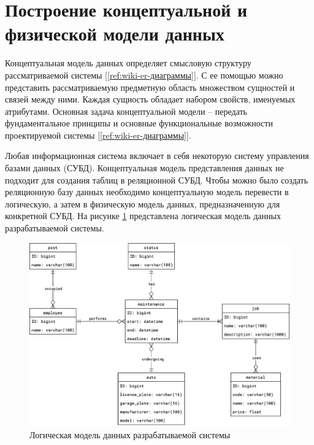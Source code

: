 \documentclass[../nirs.tex]{subfiles}
\begin{document}
\section{Построение концептуальной и физической модели данных}
Концептуальная модель данных определяет смысловую структуру рассматриваемой
системы [\ref{ref:wiki-er-диаграммы}]. С ее помощью можно представить рассматриваемую предметную область
множеством сущностей и связей между ними. Каждая сущность обладает набором
свойств, именуемых атрибутами. Основная задача концептуальной модели -- передать
фундаментальное принципы и основные функциональные возможности проектируемой
системы [\ref{ref:wiki-er-диаграммы}].

Любая информационная система включает в себя некоторую систему управления базами
данных (СУБД). Концептуальная модель представления данных не подходит для
создания таблиц в реляционной СУБД. Чтобы можно было создать реляционную базу
данных необходимо концептуальную модель перевести в логическую, а затем в
физическую  модель данных, предназначенную для конкретной СУБД. На рисунке
\ref{fig:3_1_db_logical} представлена логическая модель данных разрабатываемой
системы.

\clearpage
\begin{landscape}

\begin{figure}[H]
	\centering
	\includegraphics[keepaspectratio,width=\paperwidth]{./images/3_1_db_logical.png}
	\caption{Логическая модель данных разрабатываемой системы}
	\label{fig:3_1_db_logical}
\end{figure}

\end{landscape}
\clearpage
\end{document}
